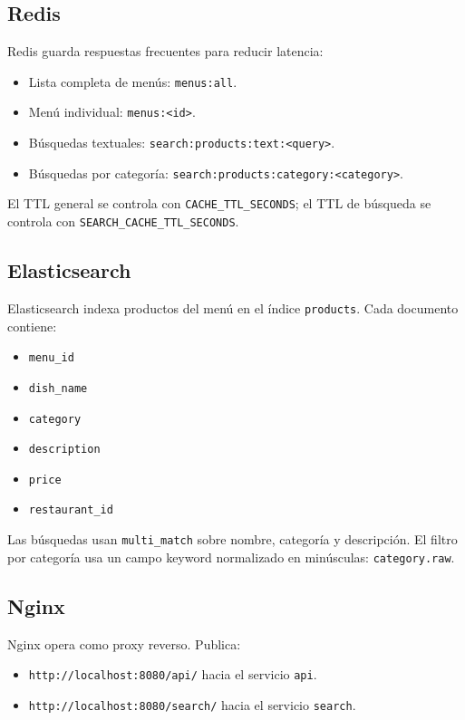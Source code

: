 \documentclass[12pt,letterpaper]{article}
\def\codefile#1{\nolinkurl{#1}}
\begin{document}
\subsection{Redis}

Redis guarda respuestas frecuentes para reducir latencia:

\begin{itemize}
    \item Lista completa de menús: \codefile{menus:all}.
    \item Menú individual: \codefile{menus:<id>}.
    \item Búsquedas textuales: \codefile{search:products:text:<query>}.
    \item Búsquedas por categoría: \codefile{search:products:category:<category>}.
\end{itemize}

El TTL general se controla con \codefile{CACHE\_TTL\_SECONDS}; el TTL de búsqueda se controla con \codefile{SEARCH\_CACHE\_TTL\_SECONDS}.

\subsection{Elasticsearch}

Elasticsearch indexa productos del menú en el índice \codefile{products}. Cada documento contiene:

\begin{itemize}
    \item \codefile{menu\_id}
    \item \codefile{dish\_name}
    \item \codefile{category}
    \item \codefile{description}
    \item \codefile{price}
    \item \codefile{restaurant\_id}
\end{itemize}

Las búsquedas usan \codefile{multi\_match} sobre nombre, categoría y descripción. El filtro por categoría usa un campo keyword normalizado en minúsculas: \codefile{category.raw}.

\subsection{Nginx}

Nginx opera como proxy reverso. Publica:

\begin{itemize}
    \item \codefile{http://localhost:8080/api/} hacia el servicio \codefile{api}.
    \item \codefile{http://localhost:8080/search/} hacia el servicio \codefile{search}.
\end{itemize}
\end{document}
